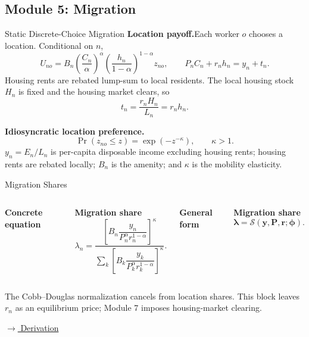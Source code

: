 \documentclass[aspectratio=169,11pt]{beamer}
\newcommand{\B}[1]{\textcolor{blue1}{\textbf{#1}}}
\newcommand{\derivlink}[1]{%
  \hyperlink{#1}{\textcolor{blue1}{\footnotesize
  \(\longrightarrow\) Derivation}}}
\begin{document}
\subsection{Module 5: Migration}

\begin{frame}{Static Discrete-Choice Migration}
  \small
  \setlength{\abovedisplayskip}{3pt}
  \setlength{\belowdisplayskip}{3pt}
  \B{Location payoff.}\quad Each worker \(o\) chooses a location. Conditional on \(n\),
  \[
    U_{no}
    =
    B_n
    \left(\frac{C_n}{\alpha}\right)^\alpha
    \left(\frac{h_n}{1-\alpha}\right)^{1-\alpha}
    z_{no},
    \qquad
    P_nC_n+r_nh_n
    =
    y_n+t_n.
  \]
  Housing rents are rebated lump-sum to local residents. The local housing
  stock \(H_n\) is fixed and the housing market clears, so
  \[
    t_n=\frac{r_nH_n}{L_n}=r_nh_n.
  \]

  \B{Idiosyncratic location preference.}
  \[
    \Pr(z_{no}\leq z)
    =
    \exp\!\left(-z^{-\kappa}\right),
    \qquad \kappa>1.
  \]
  {\scriptsize
  \(y_n=E_n/L_n\) is per-capita disposable income excluding housing rents;
  housing rents are rebated locally; \(B_n\) is the amenity;
  and \(\kappa\) is the mobility elasticity.}
\end{frame}

\begin{frame}[t,label=mainMigration]{Migration Shares}
  \small
  \begin{columns}[T,onlytextwidth]
      \B{Concrete equation}

      \B{Migration share}
      \[
        \lambda_n
        =
        \frac{
          \left[
          B_n\dfrac{y_n}
          {P_n^\alpha r_n^{1-\alpha}}
          \right]^\kappa
        }{
          \displaystyle\sum_k
          \left[
          B_k\dfrac{y_k}
          {P_k^\alpha r_k^{1-\alpha}}
          \right]^\kappa
        }.
      \]

      \B{General form}

      \B{Migration share}
      \[
        \boldsymbol\lambda
        =
        \mathcal S(\mathbf y,\mathbf P,\mathbf r;
        \boldsymbol\phi).
      \]
  \end{columns}

  The Cobb--Douglas normalization cancels from location shares. This block
  leaves \(r_n\) as an equilibrium price; Module 7 imposes housing-market clearing.

  \smallskip
  \hfill\derivlink{appHousingIncome}
\end{frame}
\end{document}
